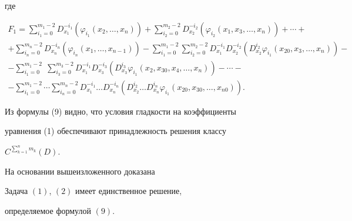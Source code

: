 где 


\begin{multline*} 


F_1=\sum^{m_1-2}_{i_1=0}D^{-i_1}_{x_1}(\varphi_{i_1}(x_2,\dotsc,x_n)) 


+\sum^{m_2-2}_{i_2=0}D^{-i_2}_{x_2} 


(\varphi_{i_2}(x_1,x_3,\dotsc,x_n))+\dotsb+ \\ 


% 


+\sum^{m_n-2}_{i_n=0}D^{-i_n}_{x_n}(\varphi_{i_n}(x_1,\dotsc,x_{n-1})) 


-\sum^{m_1-2}_{i_1=0} 


\sum^{m_2-2}_{i_2=0}D^{-i_1}_{x_1}D^{-i_2}_{x_2} 


(D^{i_2}_{x_2}\varphi_{i_1}(x_{20},x_3,\dotsc,x_n))- \\ 


% 


-\sum^{m_1-2}_{i_1=0}\; 


\sum^{m_3-2}_{i_3=0}D^{-i_1}_{x_1}D^{-i_3}_{x_3} 


(D^{i_3}_{x_3}\varphi_{i_1}(x_{2},x_{30},x_4,\dotsc,x_n))-\dotsb-\\ 


%


-\sum^{m_1-2}_{i_1=0}\dotsb 


\sum^{m_n-2}_{i_n=0}D^{-i_1}_{x_1}\dotsc D^{-i_n}_{x_n} 


(D^{i_2}_{x_2}\dotsc D^{i_n}_{x_n} 


\varphi_{i_1}(x_{20},x_{30},\dotsc,x_{n0})).


\end{multline*} 


 


Из формулы (9) видно, что условия гладкости на коэффициенты 


уравнения (1) обеспечивают принадлежность решения классу 


$C^{\sum\limits^n_{k=1}m_k}(D)$. 


 


На основании вышеизложенного доказана 


 


\begin{thmnonum} 


Задача $(1)$, $(2)$ имеет единственное решение, 


определяемое формулой $(9)$. 


\end{thmnonum} 



